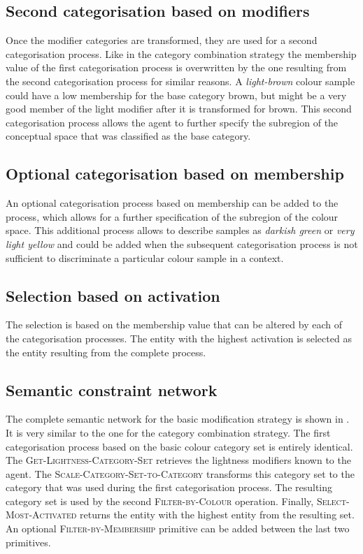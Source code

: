 \subsection{Second categorisation based on modifiers}

Once the modifier categories are transformed, they are used for a
second categorisation process. Like in the category combination
  strategy the membership value of the first categorisation process
is overwritten by the one resulting from the second categorisation
process for similar reasons. A \textit{light-brown} colour sample could
have a low membership for the base category brown, but might be a very
good member of the light modifier after it is transformed for
brown. This second categorisation process allows the agent to further
specify the subregion of the conceptual space that was classified as
the base category.

\subsection{Optional categorisation based on membership}

An optional categorisation process based on membership can be added to
the process, which allows for a further specification of the subregion
of the colour space. This additional process allows to describe
samples as \textit{darkish green} or \textit{very light yellow} and could be
added when the subsequent categorisation process is not sufficient to
discriminate a particular colour sample in a context.

\subsection{Selection based on activation}

The selection is based on the membership value that can be altered by
each of the categorisation processes. The entity with the highest
activation is selected as the entity resulting from the complete
process.

\subsection{Semantic constraint network}

The complete semantic network for the basic modification
  strategy is shown in . It is
very similar to the one for the category combination
  strategy. The first categorisation process based on the basic
colour category set is entirely identical. The
\textsc{Get-Lightness-Category-Set} retrieves the lightness
modifiers known to the agent. The
\textsc{Scale-Category-Set-to-Category} transforms this category set
to the category that was used during the first categorisation
process. The resulting category set is used by the second
\textsc{Filter-by-Colour} operation. Finally,
\textsc{Select-Most-Activated} returns the entity with the highest
entity from the resulting set. An optional
\textsc{Filter-by-Membership} primitive can be added between the last
two primitives.

